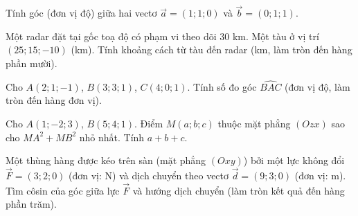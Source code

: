 \begin{bai}Tính góc (đơn vị độ) giữa hai vectơ $\vec a=(1;1;0)$ và $\vec b=(0;1;1)$.\otraloi{}\end{bai}
\begin{bai}Một radar đặt tại gốc toạ độ có phạm vi theo dõi $30$ km. Một tàu ở vị trí $(25;15;-10)$ (km). Tính khoảng cách từ tàu đến radar (km, làm tròn đến hàng phần mười).\otraloi{}\end{bai}
\begin{bai}Cho $A(2;1;-1)$, $B(3;3;1)$, $C(4;0;1)$. Tính số đo góc $\widehat{BAC}$ (đơn vị độ, làm tròn đến hàng đơn vị).\otraloi{}\end{bai}
\begin{bai}Cho $A(1;-2;3)$, $B(5;4;1)$. Điểm $M(a;b;c)$ thuộc mặt phẳng $(Ozx)$ sao cho $MA^2+MB^2$ nhỏ nhất. Tính $a+b+c$.\otraloi{}\end{bai}
\begin{bai}Một thùng hàng được kéo trên sàn (mặt phẳng $(Oxy)$) bởi một lực không đổi $\vec F=(3;2;0)$ (đơn vị: N) và dịch chuyển theo vectơ $\vec d=(9;3;0)$ (đơn vị: m). Tìm côsin của góc giữa lực $\vec F$ và hướng dịch chuyển (làm tròn kết quả đến hàng phần trăm).
\otraloi
{}\end{bai}
